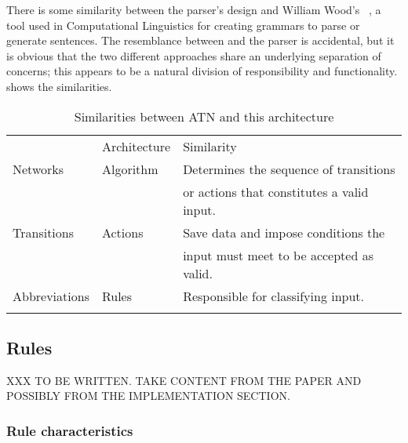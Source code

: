 There is some similarity between the parser's design and William Wood's
\ATN{}~\cite{atns,nlpip}, a tool used in Computational Linguistics for
creating grammars to parse or generate sentences.  The resemblance between
\ATN{} and the parser is accidental, but it is obvious that the two
different approaches share an underlying separation of concerns; this
appears to be a natural division of responsibility and functionality.
 shows the
similarities.


\begin{table}[ht]
    \caption{Similarities between ATN and this architecture}
    \empty{}\label{Similarities between ATN and this architecture}
    \begin{tabular}[]{lll}
        \tableline{}
        \ATN{}          & Architecture  & Similarity                \\
        \tableline{}
        Networks        & Algorithm     & Determines the sequence 
                                        of transitions              \\
                        &               & or actions that 
                                        constitutes a valid  input. \\
        Transitions     & Actions       & Save data and impose
                                        conditions the              \\
                        &               & input must meet to be
                                        accepted as valid.          \\
        Abbreviations   & Rules         & Responsible for 
                                        classifying input.          \\
        \tableline{}
    \end{tabular}
\end{table}

\subsection{Rules}

\label{rule in architecture}

XXX TO BE WRITTEN\@.  TAKE CONTENT FROM THE PAPER AND POSSIBLY FROM THE
IMPLEMENTATION SECTION\@.

\subsubsection{Rule characteristics}

